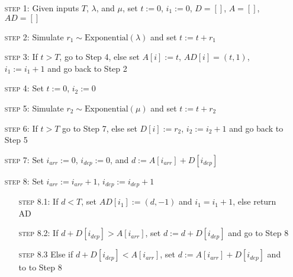 \documentclass[11pt, oneside]{article}
\begin{document}
\begin{enumerate}[leftmargin=30pt, labelindent=65pt, itemindent=30pt]
\item[\textsc{step 1:}] Given inputs $T$, $\lambda$, and $\mu$, set $t:=0$, $i_1:=0$, $D=[]$, $A=[]$, $AD=[]$
\item[\textsc{step 2:}] Simulate $r_1 \sim \text{Exponential} (\lambda)$ and set $t:=t+r_1$
\item[\textsc{step 3:}] If $t > T$, go to Step 4, else set $A[i]:=t$, $AD[i] = (t,1)$, $i_1:=i_1+1$ and go back to Step 2
\item[\textsc{step 4:}] Set $t:=0$, $i_2:=0$
\item[\textsc{step 5:}] Simulate $r_2 \sim \text{Exponential} (\mu)$ and set $t:=t+r_2$
\item[\textsc{step 6:}] If $t>T$ go to Step 7, else set $D[i]:=r_2$, $i_2:=i_2+1$ and go back to Step 5
\item[\textsc{step 7:}] Set $i_{arr}:=0$, $i_{dep}:=0$, and $d:=A[i_{arr}] + D[i_{dep}]$
\item[\textsc{step 8:}] Set $i_{arr}:=i_{arr}+1$, $i_{dep}:=i_{dep}+1$
\begin{enumerate}[leftmargin=25pt, labelindent=65pt, itemindent=25pt]
\item[\textsc{step 8.1:}] If $d < T$, set $AD[i_1]:= (d,-1)$ and $i_1=i_1+1$, else return AD
\item[\textsc{step 8.2:}] If $d + D[i_{dep}] > A[i_{arr}]$, set $d:=d+D[i_{dep}]$ and go to Step 8
\item[\textsc{step 8.3}] Else if $d + D[i_{dep}] < A[i_{arr}]$, set $d:=A[i_{arr}] + D[i_{dep}]$ and to to Step 8
\end{enumerate}
\end{enumerate}
\subsection{}
\subsection{}
\subsection{}
\subsection{}
\subsection{}
\subsection{}
\end{document}
